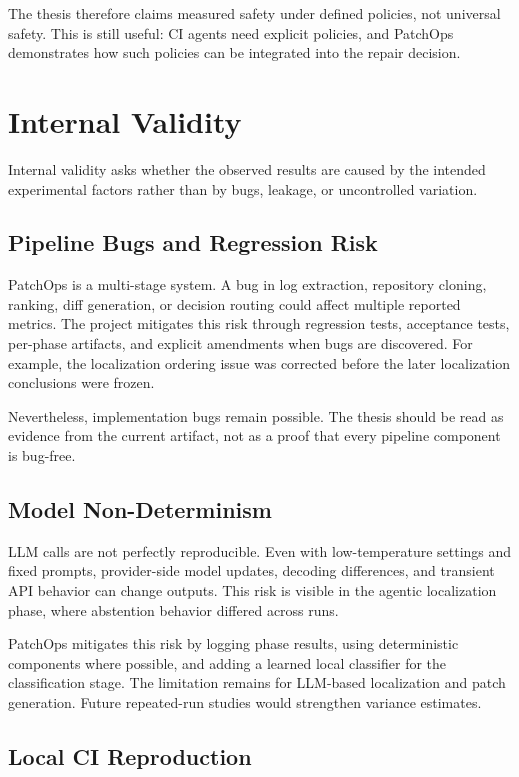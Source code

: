 The thesis therefore claims measured safety under defined policies, not universal safety. This is still useful:
CI agents need explicit policies, and PatchOps demonstrates how such policies can be integrated into the repair
decision.

\section{Internal Validity}

Internal validity asks whether the observed results are caused by the intended experimental factors rather than
by bugs, leakage, or uncontrolled variation.

\subsection{Pipeline Bugs and Regression Risk}

PatchOps is a multi-stage system. A bug in log extraction, repository cloning, ranking, diff generation, or
decision routing could affect multiple reported metrics. The project mitigates this risk through regression
tests, acceptance tests, per-phase artifacts, and explicit amendments when bugs are discovered. For example, the
localization ordering issue was corrected before the later localization conclusions were frozen.

Nevertheless, implementation bugs remain possible. The thesis should be read as evidence from the current
artifact, not as a proof that every pipeline component is bug-free.

\subsection{Model Non-Determinism}

LLM calls are not perfectly reproducible. Even with low-temperature settings and fixed prompts, provider-side
model updates, decoding differences, and transient API behavior can change outputs. This risk is visible in the
agentic localization phase, where abstention behavior differed across runs.

PatchOps mitigates this risk by logging phase results, using deterministic components where possible, and
adding a learned local classifier for the classification stage. The limitation remains for LLM-based
localization and patch generation. Future repeated-run studies would strengthen variance estimates.

\subsection{Local CI Reproduction}

